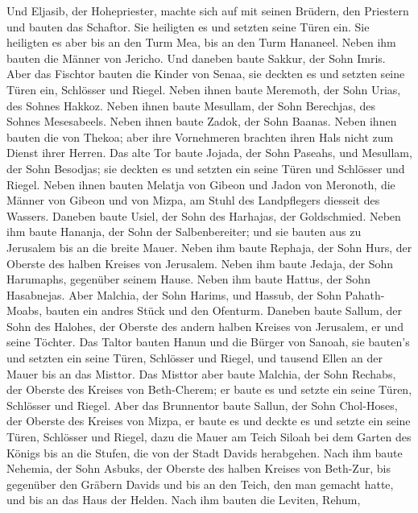  Und Eljasib, der Hohepriester, machte sich auf mit seinen
Brüdern, den Priestern und bauten das Schaftor. Sie heiligten es und
setzten seine Türen ein. Sie heiligten es aber bis an den Turm Mea, bis
an den Turm Hananeel.  Neben ihm bauten die Männer von
Jericho. Und daneben baute Sakkur, der Sohn Imris.  Aber das
Fischtor bauten die Kinder von Senaa, sie deckten es und setzten seine
Türen ein, Schlösser und Riegel.  Neben ihnen baute
Meremoth, der Sohn Urias, des Sohnes Hakkoz. Neben ihnen baute Mesullam,
der Sohn Berechjas, des Sohnes Mesesabeels. Neben ihnen baute Zadok, der
Sohn Baanas.  Neben ihnen bauten die von Thekoa; aber ihre
Vornehmeren brachten ihren Hals nicht zum Dienst ihrer Herren.
 Das alte Tor baute Jojada, der Sohn Paseahs, und Mesullam,
der Sohn Besodjas; sie deckten es und setzten ein seine Türen und
Schlösser und Riegel.  Neben ihnen bauten Melatja von Gibeon
und Jadon von Meronoth, die Männer von Gibeon und von Mizpa, am Stuhl
des Landpflegers diesseit des Wassers.  Daneben baute Usiel,
der Sohn des Harhajas, der Goldschmied. Neben ihm baute Hananja, der
Sohn der Salbenbereiter; und sie bauten aus zu Jerusalem bis an die
breite Mauer.  Neben ihm baute Rephaja, der Sohn Hurs, der
Oberste des halben Kreises von Jerusalem.  Neben ihm baute
Jedaja, der Sohn Harumaphs, gegenüber seinem Hause. Neben ihm baute
Hattus, der Sohn Hasabnejas.  Aber Malchia, der Sohn
Harims, und Hassub, der Sohn Pahath-Moabs, bauten ein andres Stück und
den Ofenturm.  Daneben baute Sallum, der Sohn des Halohes,
der Oberste des andern halben Kreises von Jerusalem, er und seine
Töchter.  Das Taltor bauten Hanun und die Bürger von
Sanoah, sie bauten's und setzten ein seine Türen, Schlösser und Riegel,
und tausend Ellen an der Mauer bis an das Misttor.  Das
Misttor aber baute Malchia, der Sohn Rechabs, der Oberste des Kreises
von Beth-Cherem; er baute es und setzte ein seine Türen, Schlösser und
Riegel.  Aber das Brunnentor baute Sallun, der Sohn
Chol-Hoses, der Oberste des Kreises von Mizpa, er baute es und deckte es
und setzte ein seine Türen, Schlösser und Riegel, dazu die Mauer am
Teich Siloah bei dem Garten des Königs bis an die Stufen, die von der
Stadt Davids herabgehen.  Nach ihm baute Nehemia, der Sohn
Asbuks, der Oberste des halben Kreises von Beth-Zur, bis gegenüber den
Gräbern Davids und bis an den Teich, den man gemacht hatte, und bis an
das Haus der Helden.  Nach ihm bauten die Leviten, Rehum,
